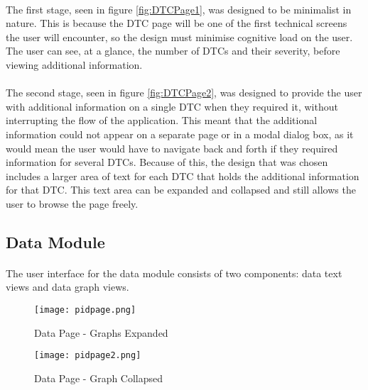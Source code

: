		\paragraph{}{
		The first stage, seen in figure \ref{fig:DTCPage1}, was designed to be minimalist in nature. This is because the DTC page will be one of the first technical screens the user will encounter, so the design must minimise cognitive load on the user. The user can see, at a glance, the number of DTCs and their severity, before viewing additional information. 		
		}
		\paragraph{}{
		The second stage, seen in figure \ref{fig:DTCPage2}, was designed to provide the user with additional information on a single DTC when they required it, without interrupting the flow of the application. This meant that the additional information could not appear on a separate page or in a modal dialog box, as it would mean the user would have to navigate back and forth if they required information for several DTCs. Because of this, the design that was chosen includes a larger area of text for each DTC that holds the additional information for that DTC. This text area can be expanded and collapsed and still allows the user to browse the page freely.
		}
					
	\subsection{Data Module}
		\paragraph{}{	
		The user interface for the data module consists of two components: data text views and data graph views.  
		}
		
		\begin{figure}[h]
			\begin{center}								
				\begin{minipage}{0.49\textwidth}
					\texttt{[image: pidpage.png]}
					\caption{Data Page - Graphs Expanded}						
					\label{fig:DataPage1}
				\end{minipage}
				\hfill			
				\begin{minipage}{0.49\textwidth}
					\texttt{[image: pidpage2.png]}
					\caption{Data Page - Graph Collapsed}						
					\label{fig:DataPage2}
				\end{minipage}									
			\end{center}
		\end{figure}
		
